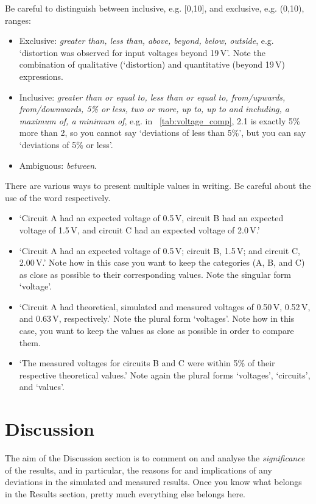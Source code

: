 \documentclass[a4paper, onecolumn, 12pt]{IEEEtran}
\begin{document}
Be careful to distinguish between inclusive, e.g. [0,10], and exclusive, e.g. (0,10), ranges: 

\begin{itemize}
    \item Exclusive: \textit{greater than, less than, above, beyond, below, outside}, e.g. `distortion was observed for input voltages beyond 19\,V'. Note the combination of qualitative (`distortion) and quantitative (beyond 19\,V) expressions.
    \item Inclusive: \textit{greater than or equal to, less than or equal to, from/upwards, from/downwards, 5\% or less, two or more, up to, up to and including, a maximum of, a minimum of}, e.g. in \tablename~\ref{tab:voltage_comp}, 2.1 is exactly 5\% more than 2, so you cannot say `deviations of less than 5\%', but you can say `deviations of 5\% or less'.
    \item Ambiguous: \textit{between}.
\end{itemize}

There are various ways to present multiple values in writing. Be careful about the use of the word respectively.

\begin{itemize}
    \item `Circuit A had an expected voltage of 0.5\,V, circuit B had an expected voltage of 1.5\,V, and circuit C had an expected voltage of 2.0\,V.'
    \item `Circuit A had an expected voltage of 0.5\,V; circuit B, 1.5\,V; and circuit C, 2.00\,V.' Note how in this case you want to keep the categories (A, B, and C) as close as possible to their corresponding values. Note the singular form `voltage'.
    \item `Circuit A had theoretical, simulated and measured voltages of 0.50\,V, 0.52\,V, and 0.63\,V, respectively.' Note the plural form `voltages'. Note how in this case, you want to keep the values as close as possible in order to compare them.
    \item `The measured voltages for circuits B and C were within 5\% of their respective theoretical values.' Note again the plural forms `voltages', `circuits', and `values'.
\end{itemize}


\section{Discussion}
\label{sec:discussion}

The aim of the Discussion section is to comment on and analyse the \textit{significance} of the results, and in particular, the reasons for and implications of any deviations in the simulated and measured results. Once you know what belongs in the Results section, pretty much everything else belongs here.
\end{document}
